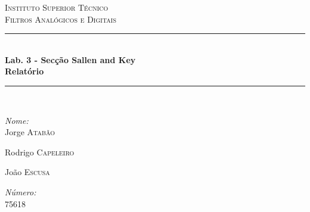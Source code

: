 
\begin{titlepage}


\newcommand{\HRule}{\rule{\linewidth}{0.5mm}} %

\center %
 \vspace*{4cm}

\textsc{\LARGE Instituto Superior Técnico}\\[1.5cm] %
\textsc{\Large Filtros Analógicos e Digitais}\\[0.5cm] %


\HRule \\[0.4cm]
{ \huge \bfseries Lab. 3 - Secção Sallen and Key}\\[0.40cm] %
{ \Large \bfseries Relatório}\\ %
\HRule \\[1.5cm]


\begin{minipage}{0.4\textwidth}
\begin{flushleft} \large
\emph{Nome:}\\
Jorge \textsc{Atabão} %

Rodrigo \textsc{Capeleiro}

João \textsc{Escusa}
\end{flushleft}
\end{minipage}
\begin{minipage}{0.4\textwidth}
\begin{flushright} \large
\emph{Número:} \\
75618


\end{flushright}
\end{minipage}
\end{titlepage}
